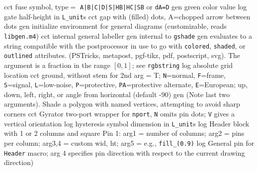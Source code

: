   {cct}
  {fuse symbol, type$=$
  {\tt  A|B|C|D|S|HB|HC|SB} or {\tt dA=D}}
%
  {gen}
  {green color value}
  {log}
  {gate half-height in {\tt L\_unit}s}
  {cct}
  {gap with (filled) dots, A=chopped arrow between dots}
  {gen}
  {initialize environment for general diagrams
    (customizable, reads {\tt libgen.m4})}
  {cct}
  {internal general labeller}
  {gen}
  {internal to {\tt gshade}}
  {gen}
  {evaluates to a string compatible with the postprocessor in use
   to go with {\tt colored}, {\tt shaded}, or {\tt outlined} attributes.
   (PSTricks, metapost, pgf-tikz, pdf, postscript, svg).
   The argument is a fraction in the range $[0,1]$; see {\tt rgbstring}}
  {log}
  {absolute grid location}
  {cct}
  { ground, without stem for 2nd arg = T;
    {\tt N}=normal, {\tt F}=frame, {\tt S}=signal, {\tt L}=low-noise,
    {\tt P}=protective,
    {\tt PA}=protective alternate,
    {\tt E}=European; up, down, left, right, or angle
    from horizontal (default -90) 
   }
  {gen}
  {(Note last two arguments).  Shade a polygon with named
    vertices, attempting to avoid sharp corners}
  {cct}
  {Gyrator two-port wrapper for {\tt nport}, {\tt N} omits pin dots; {\tt V}
   gives a vertical orientation
   }
%
  {log}
  {hysteresis symbol dimension in {\tt L\_unit}s}
  {log}
  {Header block with 1 or 2 columns and square Pin 1:
   arg1 = number of columns;
   arg2 = pins per column;
   arg3,4 = custom wid, ht;
   arg5 = e.g., {\tt fill\_(0.9)}
    }
  {log}
  {General pin for {\tt Header} macro; arg 4 specifies pin direction
   with respect to the current drawing direction)}
